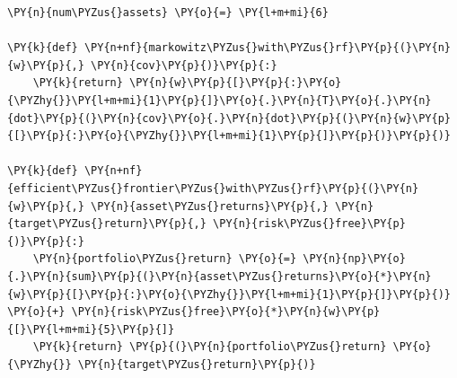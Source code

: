 \begin{tcolorbox}[breakable, size=fbox, boxrule=1pt, pad at break*=1mm,colback=cellbackground, colframe=cellborder]
\begin{Verbatim}[commandchars=\\\{\}]
\PY{n}{num\PYZus{}assets} \PY{o}{=} \PY{l+m+mi}{6}
		
\PY{k}{def} \PY{n+nf}{markowitz\PYZus{}with\PYZus{}rf}\PY{p}{(}\PY{n}{w}\PY{p}{,} \PY{n}{cov}\PY{p}{)}\PY{p}{:}
    \PY{k}{return} \PY{n}{w}\PY{p}{[}\PY{p}{:}\PY{o}{\PYZhy{}}\PY{l+m+mi}{1}\PY{p}{]}\PY{o}{.}\PY{n}{T}\PY{o}{.}\PY{n}{dot}\PY{p}{(}\PY{n}{cov}\PY{o}{.}\PY{n}{dot}\PY{p}{(}\PY{n}{w}\PY{p}{[}\PY{p}{:}\PY{o}{\PYZhy{}}\PY{l+m+mi}{1}\PY{p}{]}\PY{p}{)}\PY{p}{)}
		
\PY{k}{def} \PY{n+nf}{efficient\PYZus{}frontier\PYZus{}with\PYZus{}rf}\PY{p}{(}\PY{n}{w}\PY{p}{,} \PY{n}{asset\PYZus{}returns}\PY{p}{,} \PY{n}{target\PYZus{}return}\PY{p}{,} \PY{n}{risk\PYZus{}free}\PY{p}{)}\PY{p}{:} 
    \PY{n}{portfolio\PYZus{}return} \PY{o}{=} \PY{n}{np}\PY{o}{.}\PY{n}{sum}\PY{p}{(}\PY{n}{asset\PYZus{}returns}\PY{o}{*}\PY{n}{w}\PY{p}{[}\PY{p}{:}\PY{o}{\PYZhy{}}\PY{l+m+mi}{1}\PY{p}{]}\PY{p}{)} \PY{o}{+} \PY{n}{risk\PYZus{}free}\PY{o}{*}\PY{n}{w}\PY{p}{[}\PY{l+m+mi}{5}\PY{p}{]} 
    \PY{k}{return} \PY{p}{(}\PY{n}{portfolio\PYZus{}return} \PY{o}{\PYZhy{}} \PY{n}{target\PYZus{}return}\PY{p}{)}
	

\end{Verbatim}
\end{tcolorbox}
